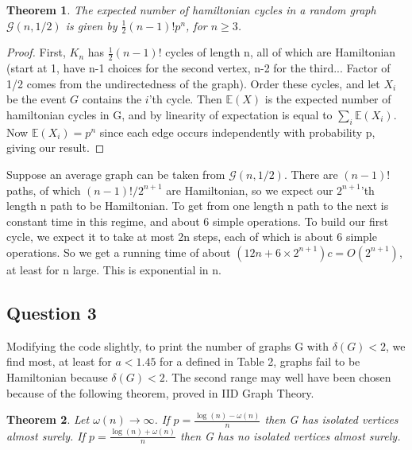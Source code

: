 \documentclass[10pt,a4paper]{report}
\newtheorem*{theorem}{Theorem}
\begin{document}
\begin{theorem} 
The expected number of hamiltonian cycles in a random graph $\mathcal{G}(n,1/2)$ is given by $\frac{1}{2}(n-1)!p^n$, for $n\geq3$.
\end{theorem}
\begin{proof}
First, $K_n$ has $\frac{1}{2}(n-1)!$ cycles of length n, all of which are Hamiltonian (start at 1, have n-1 choices for the second vertex, n-2 for the third... Factor of 1/2 comes from the undirectedness of the graph). Order these cycles, and let $X_i$ be the event $G$ contains the $i$'th cycle. Then $\mathbb{E}(X)$ is the expected number of hamiltonian cycles in G, and by linearity of expectation is equal to $\sum_i \mathbb{E}(X_i)$. Now $\mathbb{E}(X_i) = p^n$ since each edge occurs independently with probability p, giving our result.
\end{proof}

Suppose an average graph can be taken from $\mathcal{G}(n,1/2)$. There are $(n-1)!$ paths, of which $(n-1)!/2^{n+1}$ are Hamiltonian, so we expect our $2^{n+1}$'th length n path to be Hamiltonian. To get from one length n path to the next is constant time in this regime, and about 6 simple operations. To build our first cycle, we expect it to take at most 2n steps, each of which is about 6 simple operations. So we get a running time of about $(12n+6\times 2^{n+1})c = O(2^{n+1})$, at least for n large. This is exponential in n.

\subsection*{Question 3}
Modifying the code slightly, to print the number of graphs G with $\delta(G) < 2$, we find most, at least for $a<1.45$ for a defined in Table 2, graphs fail to be Hamiltonian because  $\delta(G) < 2$. The second range may well have been chosen because of the following theorem, proved in IID Graph Theory.

\begin{theorem}
Let $\omega(n) \rightarrow \infty$.  If $p =\frac{\log(n)-\omega(n)}{n}$ then G has isolated vertices almost surely.  If $p =\frac{\log(n)+\omega(n)}{n}$ then G has no isolated vertices almost surely.
\end{theorem}
\end{document}
